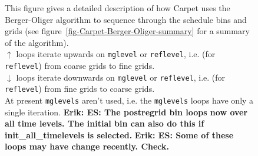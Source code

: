 \documentclass{article}
\def\todo#1{\textbf{Erik: #1}}
\def\thorn#1{\textbf{#1}}
\def\ie{i.e.\hbox{}}
\begin{document}
\begin{figure}[bp]
\begin{center}
{\begin{minipage}[c]{\textwidth}
%
 \end{minipage}
}
\end{center}
\caption[Detailed View of the \thorn{Carpet} Berger-Oliger Algorithm]
	{
	This figure gives a detailed description of how Carpet
		uses the Berger-Oliger algorithm
		to sequence through the schedule bins and grids
		(see figure~\protect\ref{fig-Carpet-Berger-Oliger-summary}
		 for a summary of the algorithm).			\\
	$\uparrow$ loops iterate upwards
		on \texttt{mglevel} or \texttt{reflevel},
		\ie{} (for \texttt{reflevel})
		from coarse grids to fine grids.			\\
	$\downarrow$ loops iterate downwards
		on \texttt{mglevel} or \texttt{reflevel},
		\ie{} (for \texttt{reflevel})
		from fine grids to coarse grids.			\\
	At present \texttt{mglevels} aren't used, \ie{} the
		\texttt{mglevels} loops have only a single iteration.	%
%
\todo{ES: The postregrid bin loops now over all time levels.  The
  initial bin can also do this if init\_all\_timelevels is selected.}
%
\todo{ES: Some of these loops may have change recently.  Check.}
%
	}
\label{fig-Carpet-Berger-Oliger-details}
\end{figure}
\end{document}
